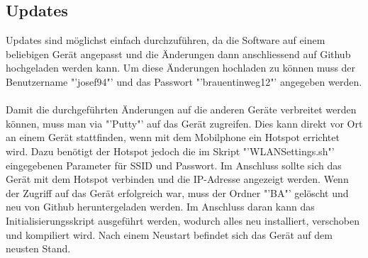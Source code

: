 \subsection{Updates}
Updates sind möglichst einfach durchzuführen, da die Software auf einem beliebigen Gerät angepasst und die Änderungen dann anschliessend auf Github hochgeladen werden kann. Um diese Änderungen hochladen zu können muss der Benutzername "'josef94"' und das Passwort "'brauentinweg12"' angegeben werden.\\\\
Damit die durchgeführten Änderungen auf die anderen Geräte verbreitet werden können, muss man via "'Putty"' auf das Gerät zugreifen. Dies kann direkt vor Ort an einem Gerät stattfinden, wenn mit dem Mobilphone ein Hotspot errichtet wird. Dazu benötigt der Hotspot jedoch die im Skript "'WLANSettings.sh"' eingegebenen Parameter für SSID und Passwort. Im Anschluss sollte sich das Gerät mit dem Hotspot verbinden und die IP-Adresse angezeigt werden. Wenn der Zugriff auf das Gerät erfolgreich war, muss der Ordner "'BA"' gelöscht und neu von Github heruntergeladen werden. Im Anschluss daran kann das Initialisierungsskript ausgeführt werden, wodurch alles neu installiert, verschoben und kompiliert wird. Nach einem Neustart befindet sich das Gerät auf dem neusten Stand.